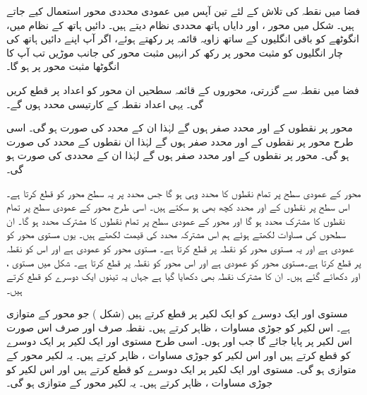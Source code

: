 فضا میں نقطہ کی تلاش کے لئے تین آپس میں عمودی محددی محور استعمال کیے جاتے ہیں۔  شکل  میں محور ،  اور  دایاں ہاتھ محددی نظام دیتے ہیں۔ دائیں ہاتھ کے نظام میں، انگوٹھے کو باقی انگلیوں کے ساتھ زاویہ قائمہ پر رکھتے ہوئے، اگر آپ اپنے دائیں ہاتھ کی چار انگلیوں کو مثبت  محور پر رکھ کر انہیں مثبت  محور کی جانب موڑیں تب آپ کا انگوٹھا مثبت  محور پر ہو گا۔

فضا میں نقطہ  سے گزرتی، محوروں کے قائمہ سطحیں ان محور کو اعداد   پر قطع کریں گی۔ یہی اعداد نقطہ  کے کارتیسی محدد ہوں گے۔  

محور  پر نقطوں کے  اور  محدد صفر ہوں گے لہٰذا ان کے محدد کی صورت  ہو گی۔ اسی طرح محور  پر نقطوں کے  اور  محدد صفر ہوں گے لہٰذا ان نقطوں کے محدد کی صورت  ہو گی۔ محور  پر نقطوں کے  اور  محدد صفر ہوں گے لہٰذا ان کے محددی کی صورت  ہو گی۔

محور  کے عمودی سطح پر تمام نقطوں کا  محدد وہی ہو گا جس  محدد  پر یہ سطح  محور کو قطع کرتا ہے۔ اس سطح پر نقطوں کے  اور  محدد کچھ بھی ہو سکتے ہیں۔ اسی طرح محور  کے عمودی سطح پر تمام نقطوں کا مشترک  محدد ہو گا اور  محور  کے عمودی سطح پر تمام نقطوں کا مشترک  محدد ہو گا۔ ان سطحوں کی مساوات لکھتے ہوئے ہم اس مشترکہ محدد کی قیمت لکھتے ہیں۔ یوں مستوی  محور  کو عمودی ہے اور یہ مستوی محور  کو نقطہ  پر قطع کرتا ہے۔ مستوی  محور  کو عمودی ہے اور اس کو نقطہ  پر قطع کرتا ہے۔مستوی  محور  کو عمودی ہے اور اس محور کو نقطہ  پر قطع کرتا ہے۔ شکل  میں مستوی ،  اور  دکھائے گئے ہیں۔ ان کا مشترک نقطہ بھی دکھایا گیا ہے جہاں یہ تینوں ایک دوسرے کو قطع کرتے ہیں۔

مستوی  اور  ایک دوسرے کو ایک لکیر پر قطع کرتے ہیں (شکل ) جو محور  کے متوازی ہے۔ اس لکیر کو جوڑی مساوات ،  ظاہر کرتے ہیں۔ نقطہ  صرف اور صرف اس صورت اس لکیر پر پایا جائے گا جب  اور  ہوں۔ اسی طرح مستوی  اور  ایک لکیر پر ایک دوسرے کو قطع کرتے ہیں اور اس لکیر کو جوڑی مساوات ،  ظاہر کرتے ہیں۔ یہ لکیر محور  کے متوازی ہو گی۔ مستوی  اور  ایک لکیر پر ایک دوسرے کو قطع کرتے ہیں اور اس لکیر کو جوڑی مساوات ،  ظاہر کرتے ہیں۔ یہ لکیر محور  کے متوازی ہو گی۔

